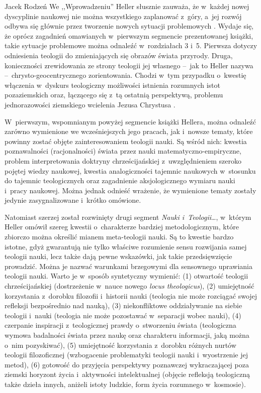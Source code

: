 \begin{newrevplenv}{Jacek Rodzeń}
We ,,Wprowadzeniu'' Heller słusznie zauważa, że w~każdej nowej dyscyplinie naukowej nie można wszystkiego zaplanować z~góry, a~jej rozwój odbywa się głównie przez tworzenie nowych sytuacji problemowych
\parencite[][s.~16]{heller_nauka_2019}. %
 Wydaje się, że oprócz zagadnień omawianych w~pierwszym segmencie prezentowanej książki, takie sytuacje problemowe można odnaleźć w~rozdziałach 3 i~5. Pierwsza dotyczy odniesienia teologii do zmieniających się obrazów świata przyrody. Druga, konieczności zrewidowania ze strony teologii jej własnego --~jak to Heller nazywa --~chrysto-geocentrycznego zorientowania. Chodzi w~tym przypadku o~kwestię włączenia w~dyskurs teologiczny możliwości istnienia rozumnych istot pozaziemskich oraz, łączącego się z~tą ostatnią perspektywą, problemu jednorazowości ziemskiego wcielenia Jezusa Chrystusa
\parencite[na ten temat por.][]{rodzen_2016}.

W~pierwszym, wspomnianym powyżej segmencie książki Hellera, można odnaleźć zarówno wymienione we wcześniejszych jego pracach, jak i~nowsze tematy, które powinny zostać objęte zainteresowaniem teologii nauki. Są wśród nich: kwestia poznawalności (racjonalności) świata przez nauki matematyczno-empiryczne, problem interpretowania doktryny chrześcijańskiej z~uwzględnieniem szeroko pojętej wiedzy naukowej, kwestia analogiczności tajemnic naukowych w~stosunku do tajemnic teologicznych oraz zagadnienie aksjologicznego wymiaru nauki i~pracy naukowej. Można jednak odnieść wrażenie, że wymienione tematy zostały jedynie zasygnalizowane i~krótko omówione.

Natomiast szerzej został rozwinięty drugi segment \textit{Nauki i~Teologii}…, w~którym Heller omówił szereg kwestii o~charakterze bardziej metodologicznym, które zbiorczo można określić mianem meta-teologii nauki. Są to kwestie bardzo istotne, gdyż gwarantują nie tylko właściwe rozumienie sensu rozwijania samej teologii nauki, lecz także dają pewne wskazówki, jak takie przedsięwzięcie prowadzić. Można je nazwać warunkami brzegowymi dla sensownego uprawiania teologii nauki. Warto je w~sposób syntetyczny wymienić: (1) otwartość teologii chrześcijańskiej (dostrzeżenie w~nauce nowego \textit{locus theologicus}), (2) umiejętność korzystania z~dorobku filozofii i~historii nauki (teologia nie może rozciągać swojej refleksji bezpośrednio nad nauką), (3) niekonfliktowe oddziaływanie na siebie teologii i~nauki (teologia nie może pozostawać w~separacji wobec nauki), (4) czerpanie inspiracji z~teologicznej prawdy o~stworzeniu świata (teologiczna wymowa badalności świata przez naukę oraz charakteru informacji, jaką można o~nim pozyskiwać), (5) umiejętność korzystania z~dorobku różnych nurtów teologii filozoficznej (wzbogacenie problematyki teologii nauki i~wyostrzenie jej metod), (6) gotowość do przyjęcia perspektywy poznawczej wykraczającej poza ziemski horyzont życia i~aktywności intelektualnej (objęcie refleksją teologiczną także dzieła innych, aniżeli istoty ludzkie, form życia rozumnego w~kosmosie).


\end{newrevplenv}
